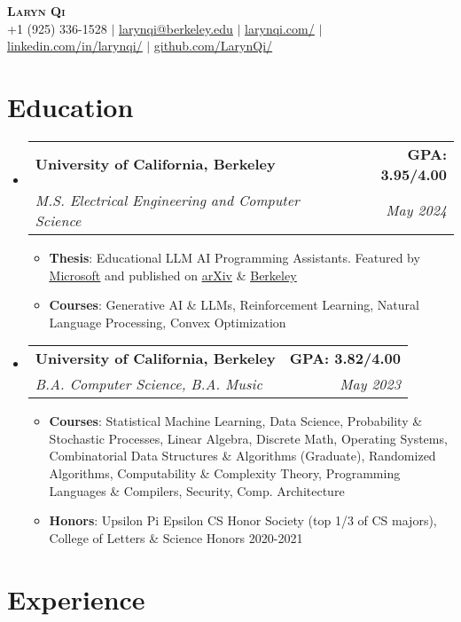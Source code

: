 \documentclass[letterpaper,11pt]{article}
\makeatletter
\newcommand{\resumeItemBF}[2]{
  \item\small{
    \textbf{#1}{: #2 \vspace{-4pt}}
  }
}
\newcommand{\resumeSubheading}[4]{
  \vspace{-2pt}\item
    \begin{tabular*}{0.97\textwidth}[t]{l@{\extracolsep{\fill}}r}
      \textbf{#1} & #2 \\
      \textit{\small#3} & \textit{\small #4} \\
    \end{tabular*}\vspace{-8pt}
}
\newcommand{\resumeSubHeadingListStart}{\begin{itemize}[leftmargin=0.05in, label={}]}
\newcommand{\resumeSubHeadingListEnd}{\end{itemize}}
\newcommand{\resumeItemListStart}{\begin{itemize}[leftmargin=0.2in]}
\newcommand{\resumeItemListEnd}{\end{itemize}\vspace{-5pt}}
\makeatother
\begin{document}
\begin{center}
    \textbf{\Huge \scshape Laryn Qi} \\ \vspace{1pt}
    \small +1 (925) 336-1528 $|$ \href{mailto:larynqi@berkeley.edu}{\underline{larynqi@berkeley.edu}} $|$ \href{https://larynqi.com/}{\underline{larynqi.com/}} $|$
    \href{https://www.linkedin.com/in/larynqi/}{\underline{linkedin.com/in/larynqi/}} $|$
    \href{https://github.com/LarynQi/}{\underline{github.com/LarynQi/}}
\end{center}
\vspace{-15pt}


\section{Education}

\resumeSubHeadingListStart
    \resumeSubheading
            {University of California, Berkeley}{\textbf{GPA: 3.95/4.00}}{M.S. Electrical Engineering and Computer Science}{May 2024}
            \resumeItemListStart
                \resumeItemBF{Thesis}{Educational LLM AI Programming Assistants. Featured by \href{https://www.microsoft.com/en-us/education/blog/2024/09/uc-berkeley-enhances-computer-science-education-with-azure-openai-service/}{\underline{Microsoft}} and published on \href{https://arxiv.org/abs/2406.05603}{\underline{arXiv}} \& \href{https://www2.eecs.berkeley.edu/Pubs/TechRpts/2024/EECS-2024-132.html}{\underline{Berkeley}}}
                \resumeItemBF{Courses}{Generative AI \& LLMs, Reinforcement Learning, Natural Language Processing, Convex Optimization}
            \resumeItemListEnd
    \resumeSubheading
        {University of California, Berkeley}{\textbf{GPA: 3.82/4.00}}{B.A. Computer Science, B.A. Music}{May 2023}
        \resumeItemListStart
            \resumeItemBF{Courses}{Statistical Machine Learning, Data Science, Probability \& Stochastic Processes, Linear Algebra, Discrete Math,  Operating Systems, Combinatorial Data Structures \& Algorithms (Graduate), Randomized Algorithms, Computability \& Complexity Theory, Programming Languages \& Compilers, Security, Comp. Architecture}
            \resumeItemBF{Honors}{Upsilon Pi Epsilon CS Honor Society (top 1/3 of CS majors), College of Letters \& Science Honors 2020-2021}
        \resumeItemListEnd
\resumeSubHeadingListEnd


\section{Experience}
\end{document}
